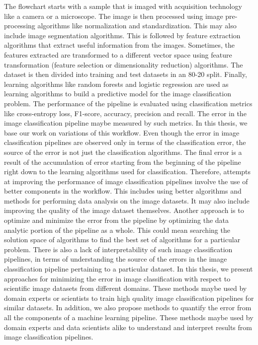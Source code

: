 The flowchart starts with a sample that is imaged with acquisition technology like a camera or a microscope. The image is then processed using image pre-processing algorithms like normalization and standardization. This may also include image segmentation algorithms. This is followed by feature extraction algorithms that extract useful information from the images. Sometimes, the features extracted are transformed to a different vector space using feature transformation (feature selection or dimensionality reduction) algorithms. The dataset is then divided into training and test datasets in an 80-20 split. Finally, learning algorithms like random forests and logistic regression are used as learning algorithms to build a predictive model for the image classification problem. The performance of the pipeline is evaluated using classification metrics like cross-entropy loss, F1-score, accuracy, precision and recall.  The error in the image classification pipeline maybe measured by such metrics. In this thesis, we base our work on variations of this workflow. Even though the error in image classification pipelines are observed only in terms of the classification error, the source of the error is not just the classification algorithms. The final error is a result of the accumulation of error starting from the beginning of the pipeline right down to the learning algorithms used for classification. Therefore, attempts at improving the performance of image classification pipelines involve the use of  better components in the workflow. This includes using better algorithms and methods for performing data analysis on the image datasets. It may also include improving the quality of the image dataset themselves. Another approach  is to optimize and minimize the error from the pipeline by optimizing the data analytic portion of the pipeline as a whole. This could mean searching the solution space of algorithms to find the best set of algorithms for a particular problem. 
There is also a lack of interpretability of such image classification pipelines, in terms of understanding the source of the errors in the image classification pipeline pertaining to a particular dataset. 
 In this thesis, we present approaches for minimizing the error in image classification with respect to scientific image datasets from different domains. These methods maybe used by domain experts or scientists to train high quality image classification pipelines for similar datasets.  In addition, we also propose methods to quantify the error from all the components of a machine learning pipeline. These methods maybe used by domain experts and data scientists alike to understand and interpret results from image classification pipelines.  

